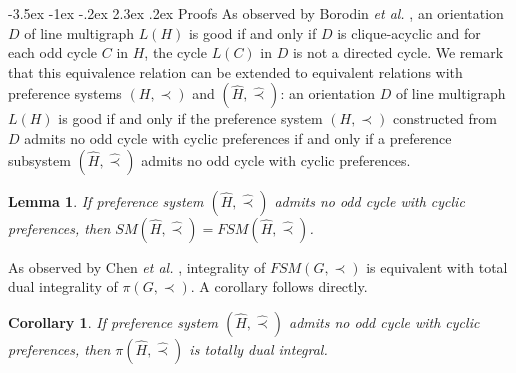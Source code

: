 \documentclass[11pt]{article}
\makeatletter
\newtheorem{lemma}[theorem]{Lemma}
\newtheorem{corollary}[theorem]{Corollary}
\numberwithin{theorem}{section}
\renewcommand\section{%
  \@startsection{section}{1}
                {\z@}%
                {-3.5ex \@plus -1ex \@minus -.2ex}%
                {2.3ex \@plus.2ex}%
                {\large\bfseries}%
}
\makeatother
\begin{document}
\section{Proofs}
As observed by Borodin \textit{et al.} \cite{BoroKost98}, an orientation $D$ of line multigraph $L(H)$ is good if and only if $D$ is clique-acyclic and for each odd cycle $C$ in $H$, the cycle $L(C)$ in $D$ is not a directed cycle. We remark that this equivalence relation can be extended to equivalent relations with preference systems $(H,\prec)$ and $(\hat{H},\hat\prec)$: an orientation $D$ of line multigraph $L(H)$ is good if and only if the preference system $(H,\prec)$ constructed from $D$ admits no odd cycle with cyclic preferences if and only if a preference subsystem $(\hat{H},\hat\prec)$ admits no odd cycle with cyclic preferences.

\begin{lemma}
\label{lem:prf1}
If preference system $(\hat{H},\hat\prec)$ admits no odd cycle with cyclic preferences, then $SM(\hat{H},\hat\prec)=FSM(\hat{H},\hat\prec)$.
\end{lemma}

As observed by Chen \textit{et al.} \cite{ChenDing12}, integrality of $FSM(G,\prec)$ is equivalent with total dual integrality of $\pi(G,\prec)$. A corollary follows directly.

\begin{corollary}
\label{cor:prf2}
If preference system $(\hat{H},\hat\prec)$ admits no odd cycle with cyclic preferences, then $\pi(\hat{H},\hat\prec)$ is totally dual integral.
\end{corollary}
\end{document}
